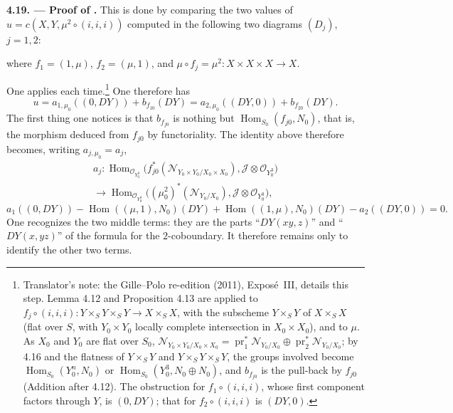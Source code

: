\medskip
\noindent{}\textbf{4.19. --- Proof of .}
This is done by comparing the two values of
\(u=c(X,Y,\mu^2\circ(i,i,i))\) computed in the following two diagrams
\((D_j)\), \(j=1,2\):

\begin{center}
\end{center}

where \(f_1=(1,\mu)\), \(f_2=(\mu,1)\), and
\(\mu\circ f_j=\mu^2:X\times X\times X\to X\).

One applies  each time.\footnote{Translator's note: the Gille--Polo re-edition (2011), Exposé~III, details
this step. Lemma 4.12 and Proposition 4.13 are applied to
\(f_j\circ(i,i,i)\colon Y\times_SY\times_SY\to X\times_SX\), with the
subscheme \(Y\times_SY\) of \(X\times_SX\) (flat over \(S\), with \(Y_0\times Y_0\)
locally complete intersection in \(X_0\times X_0\)), and to \(\mu\). As \(X_0\) and
\(Y_0\) are flat over \(S_0\), \(\mathscr N_{Y_0\times Y_0/X_0\times X_0}=
\operatorname{pr}_1^*\mathscr N_{Y_0/X_0}\oplus\operatorname{pr}_2^*
\mathscr N_{Y_0/X_0}\); by 4.16 and the flatness of \(Y\times_SY\) and
\(Y\times_SY\times_SY\), the groups involved become \(\operatorname{Hom}_{S_0}
(Y_0^n,N_0)\) or \(\operatorname{Hom}_{S_0}(Y_0^3,N_0\oplus N_0)\), and
\(b_{f_{j0}}\) is the pull-back by \(f_{j0}\) (Addition after 4.12). The
obstruction for \(f_1\circ(i,i,i)\), whose first component factors through
\(Y\), is \((0,DY)\); that for \(f_2\circ(i,i,i)\) is \((DY,0)\).} One therefore has
\[
 u=a_{1,\mu_0}((0,DY))+b_{f_{10}}(DY)
  =a_{2,\mu_0}((DY,0))+b_{f_{20}}(DY).
\]
The first thing one notices is that \(b_{f_{j0}}\) is nothing but
\(\operatorname{Hom}_{S_0}(f_{j0},N_0)\), that is, the morphism deduced from
\(f_{j0}\) by functoriality. The identity above therefore becomes, writing
\(a_{j,\mu_0}=a_j\),
\begin{multline*}
 a_j:\operatorname{Hom}_{\mathscr O_{Y_0^3}}
 \bigl(f_{j0}^*(\mathscr N_{Y_0\times Y_0/X_0\times X_0}),
  \mathscr J\otimes\mathscr O_{Y_0^3}\bigr)\\
 \longrightarrow
 \operatorname{Hom}_{\mathscr O_{Y_0^3}}
 \bigl((\mu^2_0)^*(\mathscr N_{Y_0/X_0}),
  \mathscr J\otimes\mathscr O_{Y_0^3}\bigr),
\end{multline*}
\[
 a_1((0,DY))-\operatorname{Hom}((\mu,1),N_0)(DY)
 +\operatorname{Hom}((1,\mu),N_0)(DY)-a_2((DY,0))=0.
\]
One recognizes the two middle terms: they are the parts
``\(DY(xy,z)\)'' and ``\(DY(x,yz)\)'' of the formula for the
\(2\)-coboundary. It therefore remains only to identify the other two
terms.

